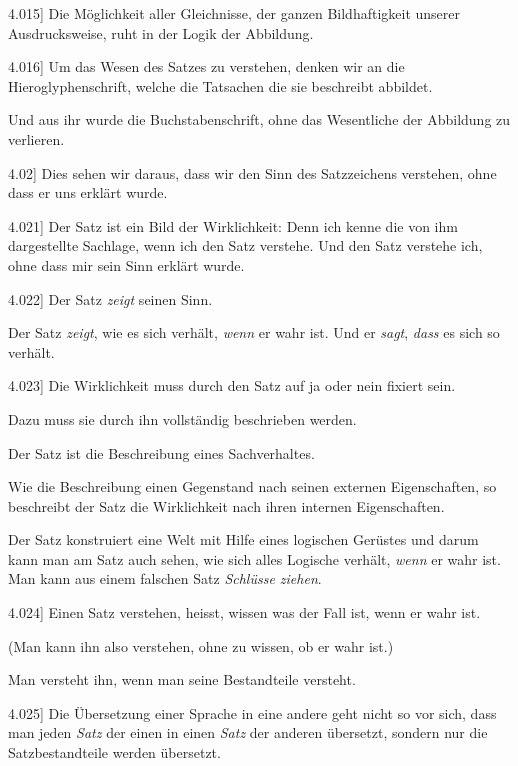 \documentclass[12pt,oneside]{book}[2007/10/19]
\newcommand{\PropERef}[1]{\hyperref[PropE:#1]{#1}}
\newcommand{\PropositionG}[2]{%
  \item[\phantomsection\label{PropG:#1}\PropERef{#1}] #2%
}
\newcommand{\DPtypo}[2]{#2}
\newcommand{\Emph}[1]{\emph{#1}}%
\begin{document}
\begin{propositions}
\PropositionG{4.015}
{Die Möglichkeit aller Gleichnisse, der ganzen
Bildhaftigkeit unserer Ausdrucksweise, ruht in der
Logik der Abbildung.}


\PropositionG{4.016}
{Um das Wesen des Satzes zu verstehen, denken
wir an die Hieroglyphenschrift, welche die Tatsachen
die sie beschreibt abbildet.

Und aus ihr wurde die Buchstabenschrift, ohne
das Wesentliche der Abbildung zu verlieren.}


\PropositionG{4.02}
{Dies sehen wir daraus, dass wir den Sinn des
Satzzeichens verstehen, ohne dass er uns erklärt
wurde.}


\PropositionG{4.021}
{Der Satz ist ein Bild der Wirklichkeit: Denn
ich kenne die von ihm dargestellte Sachlage, wenn
ich den Satz verstehe. Und den Satz verstehe ich,
ohne dass mir sein Sinn erklärt wurde.}


\PropositionG{4.022}
{Der Satz \Emph{zeigt} seinen Sinn.

Der Satz \Emph{zeigt}, wie es sich verhält, \Emph{wenn} er
wahr ist. Und er \Emph{sagt}, \Emph{dass} es sich so verhält.}


\PropositionG{4.023}
{\DPtypo{Der}{Die} Wirklichkeit muss durch den Satz auf ja
oder nein fixiert sein.

Dazu muss sie durch ihn vollständig beschrieben
werden.

Der Satz ist die Beschreibung eines Sachverhaltes.

Wie die Beschreibung einen Gegenstand nach
seinen externen Eigenschaften, so beschreibt der
Satz die Wirklichkeit nach ihren internen Eigenschaften.

Der Satz konstruiert eine Welt mit Hilfe eines
logischen Gerüstes und darum kann man am Satz
auch sehen, wie sich alles Logische verhält, \Emph{wenn}
er wahr ist. Man kann aus einem falschen Satz
\Emph{Schlüsse ziehen}.}


\PropositionG{4.024}
{Einen Satz verstehen, heisst, wissen was der
Fall ist, wenn er wahr ist.

(Man kann ihn also verstehen, ohne zu wissen,
ob er wahr ist.)

Man versteht ihn, wenn man seine Bestandteile
versteht.}


\PropositionG{4.025}
{Die Übersetzung einer Sprache in eine andere
geht nicht so vor sich, dass man jeden \Emph{Satz} der
einen in einen \Emph{Satz} der anderen übersetzt, sondern
nur die Satzbestandteile werden übersetzt.

}
\end{propositions}
\end{document}
